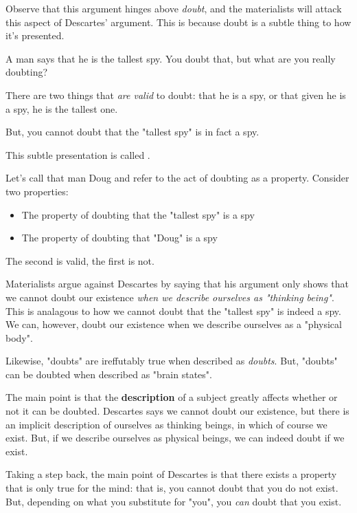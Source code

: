 Observe that this argument hinges above \textit{doubt}, and the materialists will attack this aspect of Descartes' argument. This is because doubt is a subtle thing to how it's presented.

\begin{example}
    A man says that he is the tallest spy. You doubt that, but what are you really doubting?

    There are two things that \textit{are valid} to doubt: that he is a spy, or that given he is a spy, he is the tallest one.

    But, you cannot doubt that the "tallest spy" is in fact a spy.

    This subtle presentation is called .
\end{example}

Let's call that man Doug and refer to the act of doubting as a property. Consider two properties:
\begin{itemize}
    \item The property of doubting that the "tallest spy" is a spy
    \item The property of doubting that "Doug" is a spy
\end{itemize}

The second is valid, the first is not. 

Materialists argue against Descartes by saying that his argument only shows that we cannot doubt our existence \textit{when we describe ourselves as "thinking being"}. This is analagous to how we cannot doubt that the "tallest spy" is indeed a spy. We can, however, doubt our existence when we describe ourselves as a "physical body". 

Likewise, "doubts" are ireffutably true when described as \textit{doubts}. But, "doubts" can be doubted when described as "brain states".

The main point is that the \textbf{description} of a subject greatly affects whether or not it can be doubted. Descartes says we cannot doubt our existence, but there is an implicit description of ourselves as thinking beings, in which of course we exist. But, if we describe ourselves as physical beings, we can indeed doubt if we exist.

Taking a step back, the main point of Descartes is that there exists a property that is only true for the mind: that is, you cannot doubt that you do not exist. But, depending on what you substitute for "you", you \textit{can} doubt that you exist.

